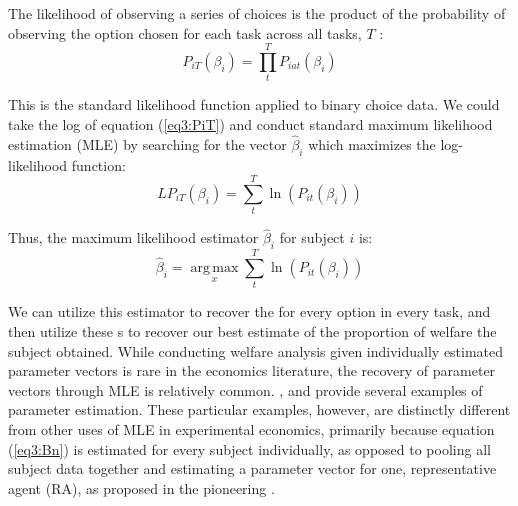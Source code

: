 \documentclass[../main.tex]{subfiles}
\begin{document}
The likelihood of observing a series of choices is the product of the probability of observing the option chosen for each task across all tasks, $T$ :
\begin{equation}
	\label{eq3:PiT}
	P_{iT}(\beta_i) =  \prod_{t}^{T} P_{iat}(\beta_i)
\end{equation}

\noindent This is the standard likelihood function applied to binary choice data.
We could take the log of equation (\ref{eq3:PiT}) and conduct standard maximum likelihood estimation (MLE) by searching for the vector $\hat{\beta}_i$ which maximizes the log-likelihood function:
\begin{equation}
	\label{eq3:LPiT}
	\mathit{LP}_{iT}(\beta_i) = \sum_{t}^{T} \ln \left( P_{it}(\beta_i) \right)
\end{equation}

\noindent Thus, the maximum likelihood estimator $\hat{\beta}_i$ for subject $i$ is:
\begin{equation}
	\label{eq3:Bn}
	\hat{\beta}_i = \underset{x}{\operatorname{arg\,max}}\sum_t^T \ln \left( P_{it}(\beta_i) \right)
\end{equation}

We can utilize this estimator to recover the {\CE} for every option in every task, and then utilize these \CE s to recover our best estimate of the proportion of welfare the subject obtained.
While conducting welfare analysis given individually estimated parameter vectors is rare in the economics literature,{\footnotemark} the recovery of parameter vectors through MLE is relatively common.
\textcite{Hey1994}, \textcite{Wilcox2015} and \textcite{Hey2001} provide several examples of parameter estimation.
These particular examples, however, are distinctly different from other uses of MLE in experimental economics, primarily because equation (\ref{eq3:Bn}) is estimated for every subject individually, as opposed to pooling all subject data together and estimating a parameter vector for one, representative agent (RA), as proposed in the pioneering \textcite{Camerer1994}.

\addtocounter{footnote}{-1}

\end{document}
